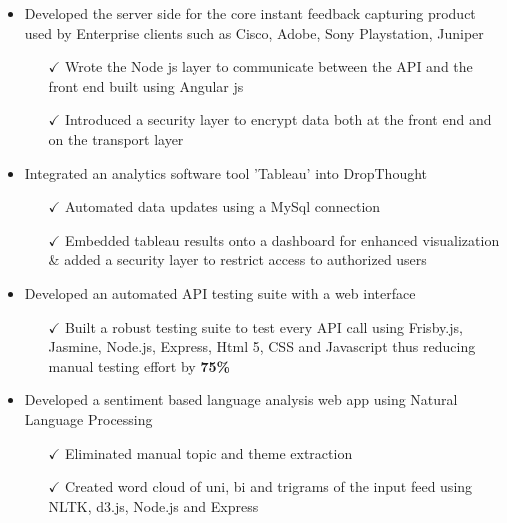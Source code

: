    \begin{itemize} \itemsep -2pt %
 \item Developed the server side for the core instant feedback capturing product used
 by Enterprise clients such as Cisco, Adobe, Sony Playstation, Juniper \itemsep -2pt
   \begin{itemize}
     \item[$\checkmark$]  \itemsep -8pt%
   Wrote the Node js layer to communicate between the API and the front end built using Angular js\\
     \item[$\checkmark$]  \itemsep -8pt%
   Introduced a security layer to encrypt data both at the front end and on the transport layer\\
      \end{itemize}       
\item Integrated an analytics software tool 'Tableau' into DropThought\itemsep -2pt
   \begin{itemize}
     \item[$\checkmark$]  \itemsep -8pt%
   Automated data updates using a MySql connection\\
     \item[$\checkmark$]  \itemsep -8pt%
   Embedded tableau results onto a dashboard for enhanced visualization \& added a security layer to restrict access to authorized users\
      \end{itemize}

\end{itemize}

   \begin{itemize} \itemsep -2pt %
  \item Developed an automated API testing  suite with a web interface\itemsep -2pt
      \begin{itemize}
      \item[$\checkmark$]  \itemsep -8pt%
   Built a robust testing suite to test every API call using Frisby.js, Jasmine, Node.js, Express, Html 5,    CSS and Javascript thus reducing manual testing effort by {\bf75\%}
      \end{itemize}   
  \item Developed a sentiment based language analysis web app using Natural Language Processing \itemsep -2pt
   \begin{itemize}
    \item[$\checkmark$]  \itemsep -8pt%
   Eliminated manual topic and theme extraction\\
     \item[$\checkmark$]  \itemsep -8pt%
   Created word cloud of uni, bi and trigrams of the input feed using NLTK, d3.js, Node.js and Express\\
      \end{itemize}         
      \end{itemize}
     

